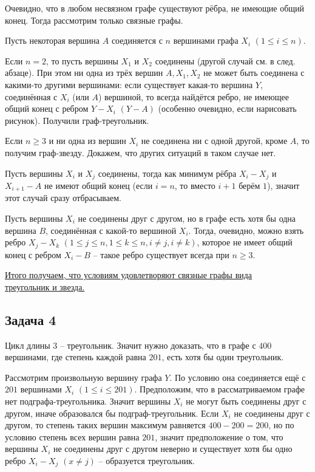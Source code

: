 \documentclass[a4paper,12pt]{article} %
\begin{document}
Очевидно, что в любом несвязном графе существуют рёбра, не имеющие общий конец. Тогда рассмотрим только связные графы.

Пусть некоторая вершина $A$ соединяется с $n$ вершинами графа $X_i$ $(1 \leqslant i \leqslant n)$.

Если $n = 2$, то пусть вершины $X_1$ и $X_2$ соединены (другой случай см. в след. абзаце). При этом ни одна из трёх вершин $A, X_1, X_2$ не может быть соединена с какими-то другими вершинами: если существует какая-то вершина $Y$, соединённая с $X_i$ (или $A$) вершиной, то всегда найдётся ребро, не имеющее общий конец с ребром $Y-X_i$ $(Y-A)$ (особенно очевидно, если нарисовать рисунок). Получили граф-треугольник.

Если $n \geqslant 3$ и ни одна из вершин $X_i$ не соединена ни с одной другой, кроме $A$, то получим граф-звезду. Докажем, что других ситуаций в таком случае нет.

Пусть вершины $X_i$ и $X_j$ соединены, тогда как минимум рёбра $X_i-X_j$ и $X_{i+1}-A$ не имеют общий конец (если $i = n$, то вместо $i+1$ берём $1$), значит этот случай сразу отбрасываем.

Пусть вершины $X_i$ не соединены друг с другом, но в графе есть хотя бы одна вершина $B$, соединённая с какой-то вершиной $X_i$. Тогда, очевидно, можно взять ребро $X_j-X_k$ $(1 \leqslant j \leqslant n, 1 \leqslant k \leqslant n, i \neq j, i \neq k)$, которое не имеет общий конец с ребром $X_i-B$ -- такое ребро существует всегда при $n \geqslant 3$.

\underline{Итого получаем, что условиям удовлетворяют связные графы вида}\\ \underline{треугольник и звезда.}


\newpage
\begin{center}
\section*{Задача 4}
\end{center}

Цикл длины $3$ -- треугольник. Значит нужно доказать, что в графе с $400$ вершинами, где степень каждой равна $201$, есть хотя бы один треугольник.

Рассмотрим произвольную вершину графа $Y$. По условию она соединяется ещё с $201$ вершинами $X_i$ $(1 \leqslant i \leqslant 201)$. Предположим, что в рассматриваемом графе нет подграфа-треугольника. Значит вершины $X_i$ не могут быть соединены друг с другом, иначе образовался бы подграф-треугольник. Если $X_i$ не соединены друг с другом, то степень таких вершин максимум равняется $400-200 = 200$, но по условию степень всех вершин равна $201$, значит предположение о том, что вершины $X_i$ не соединены друг с другом неверно и существует хотя бы одно ребро $X_i-X_j$ $(x \neq j)$ -- образуется треугольник.
\end{document}
